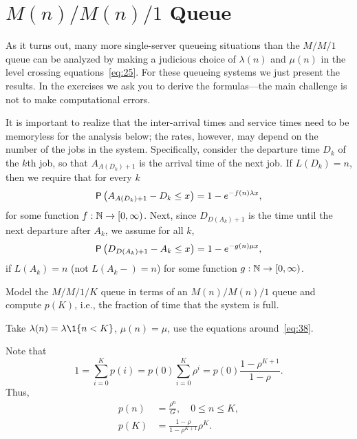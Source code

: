 \section
{$M(n)/M(n)/1$ Queue}
\label{sec:mnmn1}



As it turns out, many more single-server queueing situations than the $M/M/1$ queue can be analyzed by making a judicious choice of $\lambda(n)$ and $\mu(n)$ in the level crossing equations~\eqref{eq:25}.
For these queueing systems we just present the results.
In the exercises we ask you to derive the formulas---the main challenge is not to make computational errors.

It is important to realize that the inter-arrival times and service times need to be memoryless for the analysis below; the rates, however, may  depend on the number of the jobs in the system. Specifically, consider the departure time $D_k$ of the $k$th job, so that $A_{A(D_k)+1}$ is the arrival time of the next job. If $L(D_k)=n$, then we require that for every $k$ 
\begin{equation*}
  \P{A_{A(D_k)+1} - D_k \leq x} = 1-e^{-f(n) \lambda x},
\end{equation*}
for some function $f:\mathbb{N}\to [0,\infty)$. Next, since $D_{D(A_k)+1}$ is the time until the next departure after $A_k$, we assume for all $k$,
\begin{equation*}
  \P{D_{D(A_k)+1} - A_k \leq x} = 1-e^{-g(n) \mu x},
\end{equation*}
if $L(A_k)=n$ (not $L(A_k-)=n$) for some function $g:\mathbb{N} \to [0,\infty)$. 


  \begin{exercise}
    Model the $M/M/1/K$ queue in terms of an $M(n)/M(n)/1$ queue and compute $p(K)$, i.e., the fraction of time that the system is full.
\begin{hint}
  Take $\lambda(n) = \lambda \1{n < K}$, $\mu(n) = \mu$, use the equations around~\eqref{eq:38}.
\end{hint}
  \begin{solution}
Note that 
\begin{equation*}
1 = \sum_{i=0}^K p(i) = p(0)\sum_{i=0}^K \rho^i  = p(0) \frac{1-\rho^{K+1}}{1-\rho}. 
\end{equation*}
Thus,
\begin{subequations}\label{eq:8}
 \begin{align}
p(n) &=  \frac{\rho^n}G, \quad 0\leq n \leq K,\\
p(K) &= \frac{1-\rho}{1-\rho^{K+1}} \rho^K.
\end{align}
\end{subequations}
  \end{solution}
\end{exercise}

